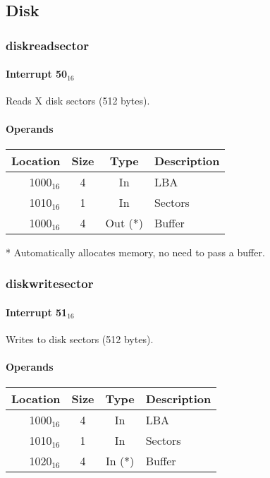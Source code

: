 \documentclass{article}
\begin{document}
\subsection{Disk}

\subsubsection{diskreadsector}

\paragraph{Interrupt 50$_{16}$}

Reads X disk sectors (512 bytes).

\paragraph{Operands}

\begin{tabular}{|r|c|c|l|}
	\hline
	\textbf{Location} & \textbf{Size} & \textbf{Type} & \textbf{Description} \\
	\hline
	1000$_{16}$ & 4 & In & LBA \\
	\hline
	1010$_{16}$ & 1 & In & Sectors \\
	\hline
	1000$_{16}$ & 4 & Out (*) & Buffer \\
	\hline
\end{tabular}

* Automatically allocates memory, no need to pass a buffer.

\subsubsection{diskwritesector}

\paragraph{Interrupt 51$_{16}$}

Writes to disk sectors (512 bytes).

\paragraph{Operands}

\begin{tabular}{|r|c|c|l|}
	\hline
	\textbf{Location} & \textbf{Size} & \textbf{Type} & \textbf{Description} \\
	\hline
	1000$_{16}$ & 4 & In & LBA \\
	\hline
	1010$_{16}$ & 1 & In & Sectors \\
	\hline
	1020$_{16}$ & 4 & In (*) & Buffer \\
	\hline
\end{tabular}
\end{document}
